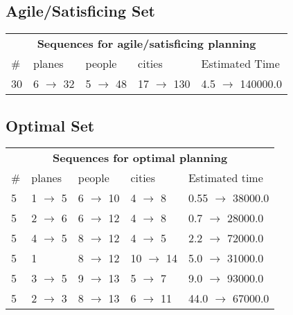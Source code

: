 \documentclass{article}
\begin{document}
                         \subsection*{Agile/Satisficing Set}

                        \begin{center}
                        \begin{tabular}{l|l|l|l|l}
                        \multicolumn{5}{c}{\bf \large Sequences for agile/satisficing planning}\\
                        \# & planes & people & cities & Estimated Time\\\midrule
                        30&6 $\rightarrow$ 32&5 $\rightarrow$ 48&17 $\rightarrow$ 130&4.5 $\rightarrow$ 140000.0
                        \end{tabular}
                        \end{center}
                    
                            \subsection*{Optimal Set}

                            \begin{center}
                            \begin{tabular}{l|l|l|l|l}
                            \multicolumn{5}{c}{\bf \large Sequences for optimal planning}\\
                            \# & planes & people & cities & Estimated time\\\midrule
                            5&1 $\rightarrow$ 5&6 $\rightarrow$ 10&4 $\rightarrow$ 8&0.55 $\rightarrow$ 38000.0\\
5&2 $\rightarrow$ 6&6 $\rightarrow$ 12&4 $\rightarrow$ 8&0.7 $\rightarrow$ 28000.0\\
5&4 $\rightarrow$ 5&8 $\rightarrow$ 12&4 $\rightarrow$ 5&2.2 $\rightarrow$ 72000.0\\
5&1&8 $\rightarrow$ 12&10 $\rightarrow$ 14&5.0 $\rightarrow$ 31000.0\\
5&3 $\rightarrow$ 5&9 $\rightarrow$ 13&5 $\rightarrow$ 7&9.0 $\rightarrow$ 93000.0\\
5&2 $\rightarrow$ 3&8 $\rightarrow$ 13&6 $\rightarrow$ 11&44.0 $\rightarrow$ 67000.0
                            \end{tabular}
                            \end{center}
                    
\end{document}
